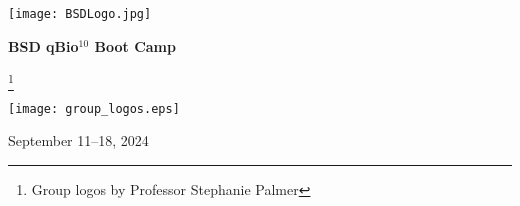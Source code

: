 \documentclass{article}
\newcommand\blfootnote[1]{%
  \begingroup
  \renewcommand\thefootnote{}\footnote{#1}%
  \addtocounter{footnote}{-1}%
  \endgroup
}
\begin{document}
\begin{centering}
\texttt{[image: BSDLogo.jpg]}

\vspace{0.11in}

\Huge{\textbf{BSD qBio$^{10}$ Boot Camp}}

\blfootnote{Group logos by Professor Stephanie Palmer}

\vspace{0.1in}

\texttt{[image: group\_logos.eps]}



\vspace{0.2in}

\Large{September 11--18, 2024}\\

\end{centering}
\end{document}

